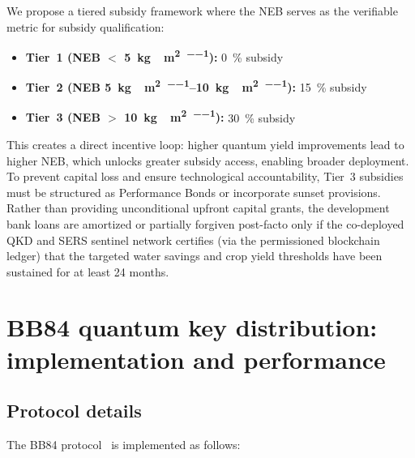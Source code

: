 \documentclass[11pt,a4paper]{article}
\begin{document}
We propose a tiered subsidy framework where the NEB serves as the verifiable metric for subsidy qualification:

\begin{itemize}
\item \textbf{Tier~1 (NEB $<$ \qty{5}{\kg{}\per\m\squared\per\yr}):} \qty{0}{\percent} subsidy
\item \textbf{Tier~2 (NEB \qtyrange{5}{10}{\kg{}\per\m\squared\per\yr}):} \qty{15}{\percent} subsidy
\item \textbf{Tier~3 (NEB $>$ \qty{10}{\kg{}\per\m\squared\per\yr}):} \qty{30}{\percent} subsidy
\end{itemize}

This creates a direct incentive loop: higher quantum yield improvements lead to higher NEB, which unlocks greater subsidy access, enabling broader deployment. To prevent capital loss and ensure technological accountability, Tier~3 subsidies must be structured as Performance Bonds or incorporate sunset provisions. Rather than providing unconditional upfront capital grants, the development bank loans are amortized or partially forgiven post-facto only if the co-deployed QKD and SERS sentinel network certifies (via the permissioned blockchain ledger) that the targeted water savings and crop yield thresholds have been sustained for at least 24 months.


\section{BB84 quantum key distribution: implementation and performance}
\label{SI-sec:qkd}

\subsection{Protocol details}

The BB84 protocol~\cite{Bennett1984} is implemented as follows:
\end{document}
